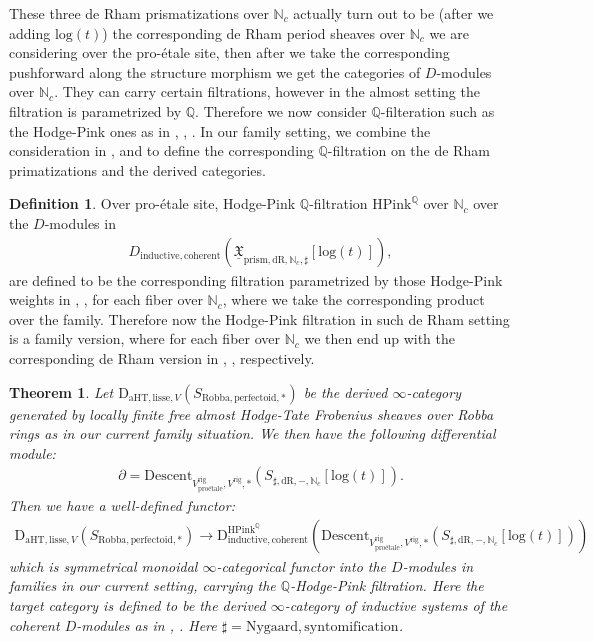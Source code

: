 \documentclass[12pt]{article}
\newtheorem{theorem}{Theorem}
\theoremstyle{definition}
\newtheorem{definition}{Definition}
\begin{document}
These three de Rham prismatizations over $\mathbb{N}_c$ actually turn out to be (after we adding $\mathrm{log}(t)$) the corresponding de Rham period sheaves over $\mathbb{N}_c$ we are considering over the pro-\'etale site, then after we take the corresponding pushforward along the structure morphism we get the categories of $D$-modules over $\mathbb{N}_c$. They can carry certain filtrations, however in the almost setting the filtration is parametrized by $\mathbb{Q}$. Therefore we now consider $\mathbb{Q}$-filteration such as the Hodge-Pink ones as in \cite{5GL1}, \cite{5GL2}, \cite{5HK}. In our family setting, we combine the consideration in \cite{5GL1}, \cite{5GL2} and \cite{5HK} to define the corresponding $\mathbb{Q}$-filtration on the de Rham primatizations and the derived categories.

\begin{definition}
Over pro-\'etale site, Hodge-Pink $\mathbb{Q}$-filtration $\mathrm{HPink}^\mathbb{Q}$ over $\mathbb{N}_c$ over the $D$-modules in 
\begin{align}
D_{\mathrm{inductive},\mathrm{coherent}}(\underline{\mathfrak{X}}_{\mathrm{prism},\mathrm{dR},\mathbb{N}_c,\sharp}[\mathrm{log}(t)]),
\end{align}
are defined to be the corresponding filtration parametrized by those Hodge-Pink weights in \cite{5GL1}, \cite{5GL2}, \cite{5HK} for each fiber over $\mathbb{N}_c$, where we take the corresponding product over the family. Therefore now the Hodge-Pink filtration in such de Rham setting is a family version, where for each fiber over $\mathbb{N}_c$ we then end up with the corresponding de Rham version in \cite{5GL1}, \cite{5GL2}, \cite{5HK} respectively.
\end{definition} 

\begin{theorem}
Let $\mathrm{D}_{\mathrm{aHT},\mathrm{lisse},V}(S_{\mathrm{Robba},\mathrm{perfectoid},*})$ be the derived $\infty$-category generated by locally finite free almost Hodge-Tate Frobenius sheaves over Robba rings as in our current family situation. We then have the following differential module:
\begin{align}
\partial=\mathrm{Descent}_{V^\mathrm{rig}_\text{pro\'etale},V^\mathrm{rig},*}(S_{\sharp,\mathrm{dR},-,\mathbb{N}_c}[\mathrm{log}(t)]).
\end{align}
Then we have a well-defined functor:
\begin{align}
\mathrm{D}_{\mathrm{aHT},\mathrm{lisse},V}(S_{\mathrm{Robba},\mathrm{perfectoid},*})\longrightarrow \mathrm{D}^{\mathrm{HPink}^\mathbb{Q}}_{\mathrm{inductive},\mathrm{coherent}}(\mathrm{Descent}_{V^\mathrm{rig}_\text{pro\'etale},V^\mathrm{rig},*}(S_{\sharp,\mathrm{dR},-,\mathbb{N}_c}[\mathrm{log}(t)]))
\end{align}
which is symmetrical monoidal $\infty$-categorical functor into the $D$-modules in families in our current setting, carrying the $\mathbb{Q}$-Hodge-Pink filtration. Here the target category is defined to be the derived $\infty$-category of inductive systems of the coherent $D$-modules as in \cite{5GR1}, \cite{5GR2}. Here $\sharp=\mathrm{Nygaard},\mathrm{syntomification}$.
\end{theorem}
\end{document}

